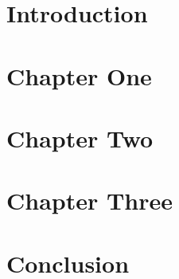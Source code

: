 \documentclass[12pt,twoside]{report}
\author{Damjan Janchevski}
\date{May 2022}
\begin{document}


\tableofcontents

\setcounter{chapter}{-1}
\chapter{Introduction}


\chapter{Chapter One}


\chapter{Chapter Two}


\chapter{Chapter Three}


\chapter{Conclusion}


\printbibliography
\end{document}
